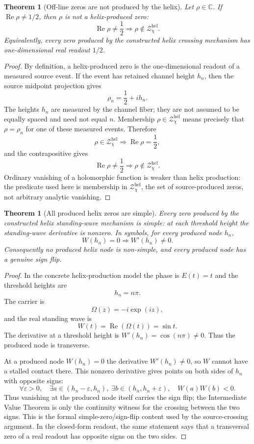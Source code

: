\documentclass[11pt]{article}
\newtheorem{theorem}[definition]{Theorem}
\DeclareMathOperator{\Ree}{Re}
\begin{document}
\begin{theorem}[Off-line zeros are not produced by the helix]
Let $\rho\in\mathbb C$.  If $\Ree\rho\ne1/2$, then $\rho$ is not a
helix-produced zero:
\[
  \Ree\rho\ne\frac12
  \Longrightarrow
  \rho\notin\mathcal Z^{\mathrm{hel}}_\chi.
\]
Equivalently, every zero produced by the constructed helix crossing mechanism
has one-dimensional real readout $1/2$.
\end{theorem}

\begin{proof}
By definition, a helix-produced zero is the one-dimensional readout of a
measured source event.  If the event has retained channel height $h_n$, then
the source midpoint projection gives
\[
  \rho_n=\frac12+i h_n .
\]
The heights $h_n$ are measured by the channel fiber; they are not assumed to be
equally spaced and need not equal $n$.  Membership $\rho\in\mathcal Z^{\mathrm{hel}}_\chi$
means precisely that $\rho=\rho_n$ for one of these measured events.  Therefore
\[
  \rho\in\mathcal Z^{\mathrm{hel}}_\chi
  \Longrightarrow
  \Ree\rho=\frac12 ,
\]
and the contrapositive gives
\[
  \Ree\rho\ne\frac12
  \Longrightarrow
  \rho\notin\mathcal Z^{\mathrm{hel}}_\chi.
\]
Ordinary vanishing of a holomorphic function is weaker than helix production:
the predicate used here is membership in $\mathcal Z^{\mathrm{hel}}_\chi$, the
set of source-produced zeros, not arbitrary analytic vanishing.
\end{proof}

\begin{theorem}[All produced helix zeros are simple]
Every zero produced by the constructed helix standing-wave mechanism is simple:
at each threshold height the standing-wave derivative is nonzero.  In symbols,
for every produced node $h_n$,
\[
  W(h_n)=0
  \Longrightarrow
  W'(h_n)\ne0 .
\]
Consequently no produced helix node is non-simple, and every produced node has
a genuine sign flip.
\end{theorem}

\begin{proof}
In the concrete helix-production model the phase is $E(t)=t$ and the threshold
heights are
\[
  h_n=n\pi .
\]
The carrier is
\[
  \Omega(z)=-i\exp(iz),
\]
and the real standing wave is
\[
  W(t)=\Ree(\Omega(t))=\sin t .
\]
The derivative at a threshold height is $W'(h_n)=\cos(n\pi)\ne0$.  Thus the
produced node is transverse.

At a produced node $W(h_n)=0$ the derivative $W'(h_n)\ne0$, so $W$ cannot have a
stalled contact there.  This nonzero derivative gives points on both sides of
$h_n$ with opposite signs:
\[
  \forall\varepsilon>0,\quad
  \exists a\in(h_n-\varepsilon,h_n),\;
  \exists b\in(h_n,h_n+\varepsilon),\quad
  W(a)W(b)<0 .
\]
Thus vanishing at the produced node itself carries the sign flip; the
Intermediate Value Theorem is only the continuity witness for the crossing
between the two signs.  This is the formal simple-zero/sign-flip content used
by the source-crossing argument.  In the closed-form readout, the same statement
says that a transversal zero of a real readout has opposite signs on the two
sides.
\end{proof}
\end{document}
